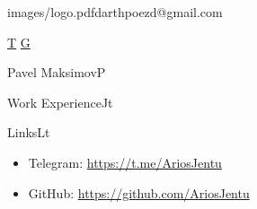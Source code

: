\documentclass[10pt]{extarticle}
\begin{document}
	
	\init

	\begin{sidebar}{images/logo.pdf}{darthpoezd@gmail.com}

		\hfill
		{
			\iconsfont\fontsize{20}{18}\selectfont
			\href{https://t.me/AriosJentu}{T}
			\href{https://github.com/AriosJentu}{G}
		}








	\end{sidebar}

	\begin{centralpart}{Pavel Maksimov}{P}{}
		
		\aboutprog

	\end{centralpart}

	\UpdatePosition
	
	\begin{centralpart}{Work Experience}{J}{t}

		\wefecrc

		\wesoftwaretd

	\end{centralpart}

	\BottomSignature

	\NewPage
	\ApplyNoSideBar
	\DrawSimpleSideBar

	\CentralProjects

	\BottomSignature
	\NewPage
	\DrawSimpleSideBar

	\CentralContributions

	\UpdatePosition
	\CentralEducation

	\UpdatePosition
	\begin{centralpart}{Links}{L}{t}
		\begin{titleblock}{}{}{}{}
			\vspace*{-25pt}
			\begin{itemize}[label=$\circ$]
				\item Telegram: {\color{sidetopsep}\href{https://t.me/AriosJentu}{https://t.me/AriosJentu}} \vp
				\item GitHub: {\color{sidetopsep}\href{https://github.com/AriosJentu}{https://github.com/AriosJentu}} \vp
			\end{itemize}
		\end{titleblock}
	\end{centralpart}


	\BottomSignature
\end{document}

